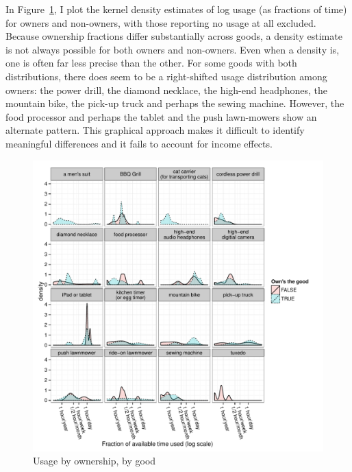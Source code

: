 \documentclass[11pt]{article}
\begin{document}
In Figure~\ref{fig:ownership_distro}, I plot the kernel density estimates of log usage (as fractions of time) for owners and non-owners, with those reporting no usage at all excluded. 
Because ownership fractions differ substantially across goods, a density estimate is not always possible for both owners and non-owners. 
Even when a density is, one is often far less precise than the other. 
For some goods with both distributions, there does seem to be a right-shifted usage distribution among owners: 
the power drill, the diamond necklace, the high-end headphones, the mountain bike, the pick-up truck and perhaps the sewing machine. 
However, the food processor and perhaps the tablet and the push lawn-mowers show an alternate pattern. 
This graphical approach makes it difficult to identify meaningful differences and it fails to account for income effects. 

\begin{figure}
\centering 
\caption{Usage by ownership, by good \label{fig:ownership_distro}}
\begin{minipage}{0.90 \linewidth}
\includegraphics[width = \linewidth]{./plots/ownership_distro.pdf} 
\end{minipage} 
\end{figure} 
\end{document}
